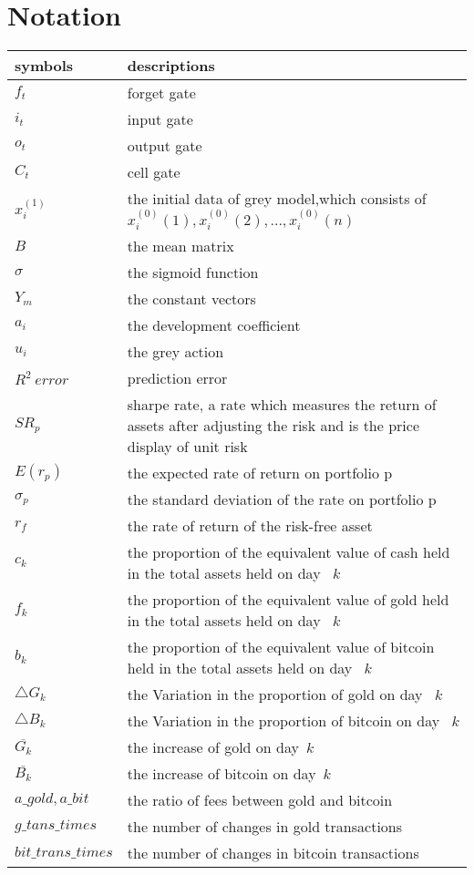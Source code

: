 \documentclass{mcmthesis}
\begin{document}
	
	
	
	
	
	\section{Notation}
		\begin{tabular}{ll}
		\hline
		symbols&descriptions\\
		\hline
		$f_{t}$&forget gate\\
		$i_{t}$&input gate\\
		$o_{t}$&output gate\\
		$C_{t}$&cell gate\\
		$x^{(1)}_{i}$&the initial data of grey model,which consists of \  $x^{(0)}_{i}(1),x^{(0)}_{i}(2),...,x^{(0)}_{i}(n)$\\
		$B$& the mean matrix\\
		$\sigma$& the sigmoid function\\
		$Y_{m}$& the constant vectors\\
		$a_{i}$&the development coefficient\\
		$u_{i}$&the grey action\\
		$R^{2} \ error$&prediction error\\
		$SR_{p}$&sharpe rate, a rate which measures the return of assets after adjusting the risk and is the price display of unit risk\\
		$E(r_{p})$& the expected rate of return on portfolio p\\
		$\sigma_{p}$& the standard deviation of the rate on portfolio p\\
		$r_{f}$& the rate of return of the risk-free asset\\
		$c_{k}$& the proportion of the equivalent value of cash held in the total assets held on day \ $k$\\
		$f_{k}$& the proportion of the equivalent value of gold held in the total assets held on day \ $k$\\
		$b_{k}$& the proportion of the equivalent value of bitcoin held in the total assets held on day \ $k$\\
		$\bigtriangleup G_{k} $ & the Variation in the proportion of gold on day \ $k$\\
		$\bigtriangleup B_{k} $ & the Variation in the proportion of bitcoin on day \ $k$\\
		$\overline{G_{k}}$& the increase of gold on day\ $k$\\
		$\overline{B_{k}}$& the increase of bitcoin on day\ $k$\\
		$a\_gold,a\_bit$&	the ratio of fees between gold and bitcoin\\
		$g\_tans\_times$& the number of changes in gold transactions\\
		$bit\_trans\_times$& the number of changes in bitcoin transactions\\
		\hline
	\end{tabular}
	
\end{document}
